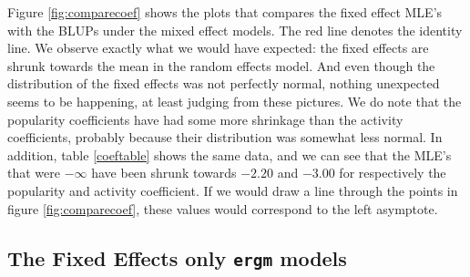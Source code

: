 \documentclass[a4paper]{article}
\begin{document}
Figure \ref{fig:comparecoef} shows the plots that compares the fixed effect MLE's with the BLUPs under the mixed effect models. The red line denotes the identity line.
We observe exactly what we would have expected: the fixed effects are shrunk towards the mean in the random effects model. And even though
the distribution of the fixed effects was not perfectly normal, nothing unexpected seems to be happening, at least judging from these pictures.
We do note that the popularity coefficients have had some more shrinkage than the activity coefficients, probably because their distribution 
was somewhat less normal.
In addition, table \ref{coeftable} shows the same data, and we can see that the MLE's that were $-\infty$ have been shrunk towards $-2.20$ and $-3.00$
for respectively the popularity and activity coefficient. If we would draw a line through the points in figure \ref{fig:comparecoef}, 
these values would correspond to the left asymptote.



 



\subsection{The Fixed Effects only \texttt{ergm} models}
\end{document}
